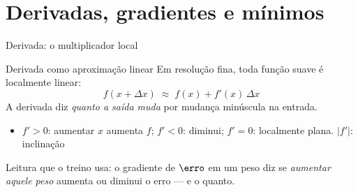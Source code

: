 \documentclass[aspectratio=169, 11pt]{beamer}
\begin{document}
\section{Derivadas, gradientes e mínimos}

\begin{frame}{Derivada: o multiplicador local}
  \begin{defbox}{Derivada como aproximação linear}
    Em resolução fina, toda função suave é localmente linear:
    \[
      f(x + \Delta x) \;\approx\; f(x) + f'(x)\, \Delta x
    \]
    A derivada diz \emph{quanto a saída muda} por mudança minúscula na entrada.
  \end{defbox}

  \begin{itemize}\setlength{\itemsep}{0.2ex}
    \item $f' > 0$: aumentar $x$ aumenta $f$;\; $f' < 0$: diminui;\;
          $f' = 0$: localmente plana.\; $|f'|$: inclinação
  \end{itemize}

  \begin{ideiabox}
    Leitura que o treino usa: o gradiente de $\erro$ em um peso diz se
    \emph{aumentar aquele peso} aumenta ou diminui o erro — e o quanto.
  \end{ideiabox}
\end{frame}
\end{document}
